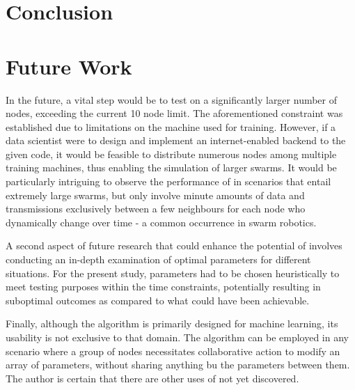 \section{Conclusion}





\section{Future Work}
In the future, a vital step would be to test \SL on a significantly larger number of nodes, exceeding the current 10 node limit. The aforementioned constraint was established due to limitations on the machine used for training. However, if a data scientist were to design and implement an internet-enabled backend to the given code, it would be feasible to distribute numerous nodes among multiple training machines, thus enabling the simulation of larger swarms. It would be particularly intriguing to observe the performance of \SL in scenarios that entail extremely large swarms, but only involve minute amounts of data and transmissions exclusively between a few neighbours for each node who dynamically change over time - a common occurrence in swarm robotics.

A second aspect of future research that could enhance the potential of \SL involves conducting an in-depth examination of optimal parameters for different situations. For the present study, parameters had to be chosen heuristically to meet testing purposes within the time constraints, potentially resulting in suboptimal outcomes as compared to what could have been achievable.

Finally, although the \SL algorithm is primarily designed for machine learning, its usability is not exclusive to that domain. The algorithm can be employed in any scenario where a group of nodes necessitates collaborative action to modify an array of parameters, without sharing anything bu the parameters between them. The author is certain that there are other uses of \SL not yet discovered.